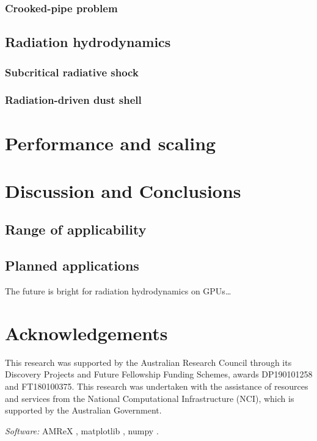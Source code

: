 \documentclass[fleqn,usenatbib]{mnras}
\begin{document}
\subsubsection{Crooked-pipe problem}

\subsection{Radiation hydrodynamics}
\subsubsection{Subcritical radiative shock}
\subsubsection{Radiation-driven dust shell}

\section{Performance and scaling}
\label{section:performance}

\section{Discussion and Conclusions}
\label{section:discussion}
\subsection{Range of applicability}
\subsection{Planned applications}

The future is bright for radiation hydrodynamics on GPUs\dots

\section*{Acknowledgements}

This research was supported by the Australian Research Council through its Discovery Projects and Future Fellowship Funding Schemes, awards DP190101258 and FT180100375. This research was undertaken with the assistance of resources and services from the National Computational Infrastructure (NCI), which is supported by the Australian Government.

\emph{Software:} AMReX \citep{the_amrex_development_team_2021_5363443},
matplotlib \citep{Hunter:2007},
numpy \citep{harris2020array}.
\end{document}
